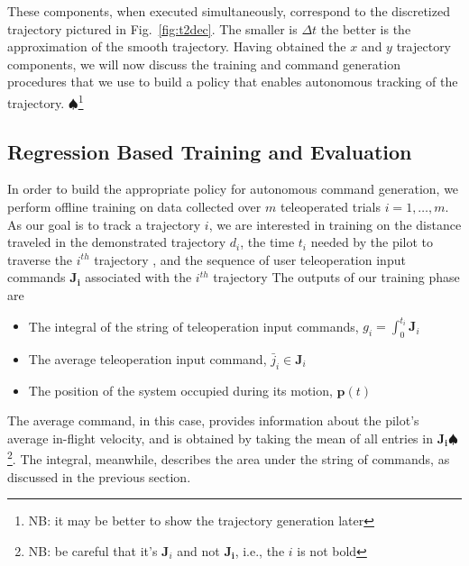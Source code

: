 \documentclass[letterpaper, 10 pt, conference]{ieeeconf}  %
\newcommand\NB[1]{$\spadesuit$\footnote{NB: #1}}
\begin{document}
These components, when executed simultaneously, correspond to the discretized trajectory pictured in Fig.~\ref{fig:t2dec}. The smaller is $\Delta t$ the better is the approximation of the smooth trajectory. Having obtained the $x$ and $y$ trajectory components, we will now discuss the training and command generation procedures that we use to build a policy that enables autonomous tracking of the trajectory.
\NB{it may be better to show the trajectory generation later}

\subsection{Regression Based Training and Evaluation} \label{sec:train}
In order to build the appropriate policy for autonomous command generation, we perform offline training on data collected over $m$ teleoperated trials $i=1,\ldots,m$. As our goal is to track a trajectory $i$, we are interested in training on the distance traveled in the demonstrated trajectory $d_i$, the time $t_i$ needed by the pilot to traverse the $i^{th}$ trajectory , and the sequence of user teleoperation input commands $\bm{J_i}$ associated with the $i^{th}$ trajectory
The outputs of our training phase are \begin{itemize} %
    \item The integral of the string of teleoperation input commands, $g_i = \int_0^{t_i}\bm{J}_i$
    \item The average teleoperation input command, $\bar{j}_i \in \bm{J}_i$
    \item The position of the system occupied during its motion, $\bm{p}(t)$
\end{itemize}
The average command, in this case, provides information about the pilot's average in-flight velocity, and is obtained by taking the mean of all entries in $\bm{J_i}$\NB{be careful that it's $\bm{J}_i$ and not $\bm{J_i}$, i.e., the $i$ is not bold}. The integral, meanwhile, describes the area under the string of commands, as discussed in the previous section.
\end{document}
